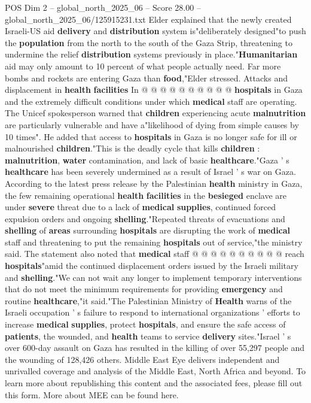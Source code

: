 \begin{textsample}{POS Dim 2 – global\_north\_2025\_06 – Score 28.00 – global\_north\_2025\_06/125915231.txt}
Elder explained that the newly created Israeli-US aid \textbf{delivery} and \textbf{distribution} system is"deliberately designed"to push the \textbf{population} from the north to the south of the Gaza Strip, threatening to undermine the relief \textbf{distribution} systems previously in place."\textbf{Humanitarian} aid may only amount to 10 percent of what people actually need.
Far more bombs and rockets are entering Gaza than \textbf{food},"Elder stressed.
Attacks and displacement in \textbf{health} \textbf{facilities} In @ @ @ @ @ @ @ @ @ @ \textbf{hospitals} in Gaza and the extremely difficult conditions under which \textbf{medical} staff are operating.
The Unicef spokesperson warned that \textbf{children} experiencing acute \textbf{malnutrition} are particularly vulnerable and have a"likelihood of dying from simple causes by 10 times".
He added that access to \textbf{hospitals} in Gaza is no longer safe for ill or malnourished \textbf{children}."This is the deadly cycle that kills \textbf{children} : \textbf{malnutrition}, \textbf{water} contamination, and lack of basic \textbf{healthcare}."Gaza ' s \textbf{healthcare} has been severely undermined as a result of Israel ' s war on Gaza.
According to the latest press release by the Palestinian \textbf{health} ministry in Gaza, the few remaining operational \textbf{health} \textbf{facilities} in the \textbf{besieged} enclave are under \textbf{severe} threat due to a lack of \textbf{medical} \textbf{supplies}, continued forced expulsion orders and ongoing \textbf{shelling}."Repeated threats of evacuations and \textbf{shelling} of \textbf{areas} surrounding \textbf{hospitals} are disrupting the work of \textbf{medical} staff and threatening to put the remaining \textbf{hospitals} out of service,"the ministry said.
The statement also noted that \textbf{medical} staff @ @ @ @ @ @ @ @ @ @ reach \textbf{hospitals}"amid the continued displacement orders issued by the Israeli military and \textbf{shelling}."We can not wait any longer to implement temporary interventions that do not meet the minimum requirements for providing \textbf{emergency} and routine \textbf{healthcare},"it said."The Palestinian Ministry of \textbf{Health} warns of the Israeli occupation ' s failure to respond to international organizations ' efforts to increase \textbf{medical} \textbf{supplies}, protect \textbf{hospitals}, and ensure the safe access of \textbf{patients}, the wounded, and \textbf{health} teams to service \textbf{delivery} sites."Israel ' s over 600-day assault on Gaza has resulted in the killing of over 55,297 people and the wounding of 128,426 others.
Middle East Eye delivers independent and unrivalled coverage and analysis of the Middle East, North Africa and beyond.
To learn more about republishing this content and the associated fees, please fill out this form.
More about MEE can be found here.

\end{textsample}

